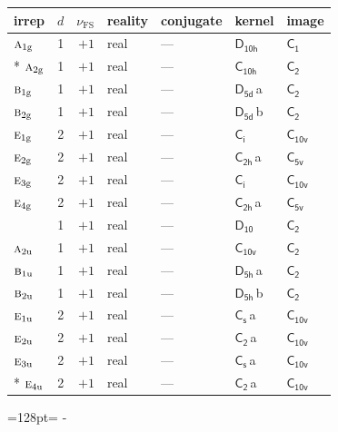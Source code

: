 \documentclass[10pt,a4paper]{article}
\newcommand{\needspace}[1]{\par\penalty-100\begingroup\dimen0=#1\relax\dimen2=\pagegoal
  \advance\dimen2-\pagetotal\ifdim\dimen0>\dimen2\relax\ifdim\dimen2>0pt\vfil\break\fi\fi
  \endgroup}
\numberwithin{equation}{section}
\newcommand{\grp}[1]{\mathsf{#1}}
\newcommand{\irr}[1]{\text{\normalfont\scshape #1}}
\newcommand{\detbox}[1]{{\setlength{\fboxsep}{1pt}\fbox{#1}}}
\newcommand{\ptag}[1]{\mathrm{#1}}
\newcommand{\clsletter}[1]{\,{\scriptsize\color{black!55}#1}}
\newcommand{\fsind}{\nu_{\mathrm{FS}}}
\begin{document}
{\small\renewcommand{\arraystretch}{1.25}\begin{longtable}{@{}lrrllll@{}}\toprule
irrep & $d$ & $\fsind$ & reality & conjugate & kernel & image\\\midrule\endhead
\bottomrule\endfoot\endlastfoot
$\irr{a}_{1\ptag{g}}$ & 1 & $+1$ & real & --- & \href{D10h.pdf}{$\grp{D_{10h}}$} & \href{C1.pdf}{$\grp{C_{1}}$}\\*
$\irr{a}_{2\ptag{g}}$ & 1 & $+1$ & real & --- & \href{C10h.pdf}{$\grp{C_{10h}}$} & \href{C2.pdf}{$\grp{C_{2}}$}\\
$\irr{b}_{1\ptag{g}}$ & 1 & $+1$ & real & --- & \href{D5d.pdf}{$\grp{D_{5d}}$}\clsletter{a} & \href{C2.pdf}{$\grp{C_{2}}$}\\
$\irr{b}_{2\ptag{g}}$ & 1 & $+1$ & real & --- & \href{D5d.pdf}{$\grp{D_{5d}}$}\clsletter{b} & \href{C2.pdf}{$\grp{C_{2}}$}\\
$\irr{e}_{1\ptag{g}}$ & 2 & $+1$ & real & --- & \href{S2.pdf}{$\grp{C_{i}}$} & \href{C10v.pdf}{$\grp{C_{10v}}$}\\
$\irr{e}_{2\ptag{g}}$ & 2 & $+1$ & real & --- & \href{C2h.pdf}{$\grp{C_{2h}}$}\clsletter{a} & \href{C5v.pdf}{$\grp{C_{5v}}$}\\
$\irr{e}_{3\ptag{g}}$ & 2 & $+1$ & real & --- & \href{S2.pdf}{$\grp{C_{i}}$} & \href{C10v.pdf}{$\grp{C_{10v}}$}\\
$\irr{e}_{4\ptag{g}}$ & 2 & $+1$ & real & --- & \href{C2h.pdf}{$\grp{C_{2h}}$}\clsletter{a} & \href{C5v.pdf}{$\grp{C_{5v}}$}\\
\detbox{$\irr{a}_{1\ptag{u}}$} & 1 & $+1$ & real & --- & \href{D10.pdf}{$\grp{D_{10}}$} & \href{C2.pdf}{$\grp{C_{2}}$}\\
$\irr{a}_{2\ptag{u}}$ & 1 & $+1$ & real & --- & \href{C10v.pdf}{$\grp{C_{10v}}$} & \href{C2.pdf}{$\grp{C_{2}}$}\\
$\irr{b}_{1\ptag{u}}$ & 1 & $+1$ & real & --- & \href{D5h.pdf}{$\grp{D_{5h}}$}\clsletter{a} & \href{C2.pdf}{$\grp{C_{2}}$}\\
$\irr{b}_{2\ptag{u}}$ & 1 & $+1$ & real & --- & \href{D5h.pdf}{$\grp{D_{5h}}$}\clsletter{b} & \href{C2.pdf}{$\grp{C_{2}}$}\\
$\irr{e}_{1\ptag{u}}$ & 2 & $+1$ & real & --- & \href{C1v.pdf}{$\grp{C_{s}}$}\clsletter{a} & \href{C10v.pdf}{$\grp{C_{10v}}$}\\
$\irr{e}_{2\ptag{u}}$ & 2 & $+1$ & real & --- & \href{C2.pdf}{$\grp{C_{2}}$}\clsletter{a} & \href{C10v.pdf}{$\grp{C_{10v}}$}\\
$\irr{e}_{3\ptag{u}}$ & 2 & $+1$ & real & --- & \href{C1v.pdf}{$\grp{C_{s}}$}\clsletter{a} & \href{C10v.pdf}{$\grp{C_{10v}}$}\\*
$\irr{e}_{4\ptag{u}}$ & 2 & $+1$ & real & --- & \href{C2.pdf}{$\grp{C_{2}}$}\clsletter{a} & \href{C10v.pdf}{$\grp{C_{10v}}$}\\
\bottomrule\end{longtable}}
\needspace{128pt}
\end{document}
